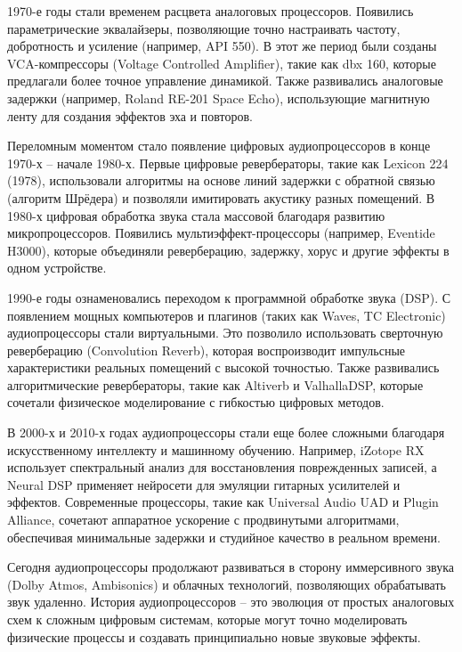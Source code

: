 1970-е годы стали временем расцвета аналоговых процессоров. Появились параметрические эквалайзеры, позволяющие точно настраивать частоту, добротность и усиление (например, API 550). В этот же период были созданы VCA-компрессоры (Voltage Controlled Amplifier), такие как dbx 160, которые предлагали более точное управление динамикой. Также развивались аналоговые задержки (например, Roland RE-201 Space Echo), использующие магнитную ленту для создания эффектов эха и повторов.

Переломным моментом стало появление цифровых аудиопроцессоров в конце 1970-х – начале 1980-х. Первые цифровые ревербераторы, такие как Lexicon 224 (1978), использовали алгоритмы на основе линий задержки с обратной связью (алгоритм Шрёдера) и позволяли имитировать акустику разных помещений. В 1980-х цифровая обработка звука стала массовой благодаря развитию микропроцессоров. Появились мультиэффект-процессоры (например, Eventide H3000), которые объединяли реверберацию, задержку, хорус и другие эффекты в одном устройстве.

1990-е годы ознаменовались переходом к программной обработке звука (DSP). С появлением мощных компьютеров и плагинов (таких как Waves, TC Electronic) аудиопроцессоры стали виртуальными. Это позволило использовать сверточную реверберацию (Convolution Reverb), которая воспроизводит импульсные характеристики реальных помещений с высокой точностью. Также развивались алгоритмические ревербераторы, такие как Altiverb и ValhallaDSP, которые сочетали физическое моделирование с гибкостью цифровых методов.

В 2000-х и 2010-х годах аудиопроцессоры стали еще более сложными благодаря искусственному интеллекту и машинному обучению. Например, iZotope RX использует спектральный анализ для восстановления поврежденных записей, а Neural DSP применяет нейросети для эмуляции гитарных усилителей и эффектов. Современные процессоры, такие как Universal Audio UAD и Plugin Alliance, сочетают аппаратное ускорение с продвинутыми алгоритмами, обеспечивая минимальные задержки и студийное качество в реальном времени.

Сегодня аудиопроцессоры продолжают развиваться в сторону иммерсивного звука (Dolby Atmos, Ambisonics) и облачных технологий, позволяющих обрабатывать звук удаленно. История аудиопроцессоров – это эволюция от простых аналоговых схем к сложным цифровым системам, которые могут точно моделировать физические процессы и создавать принципиально новые звуковые эффекты.


